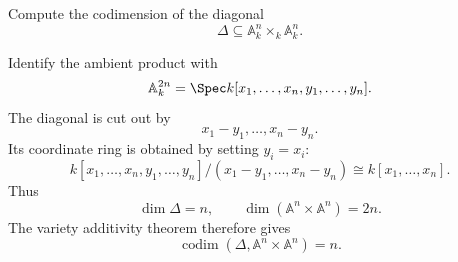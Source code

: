 \begin{problem}\label{prob:vi31-09}
Compute the codimension of the diagonal
\[
\Delta\subseteq\mathbb A^n_k\times_k\mathbb A^n_k.
\]
\end{problem}

\ifdefined\FullProblemDossiers
\begin{solution}
Identify the ambient product with
\[
\mathbb A^{2n}_k
=
\Spec k[x_1,\ldots,x_n,y_1,\ldots,y_n].
\]
The diagonal is cut out by
\[
x_1-y_1,\ldots,x_n-y_n.
\]
Its coordinate ring is obtained by setting \(y_i=x_i\):
\[
k[x_1,\ldots,x_n,y_1,\ldots,y_n]/(x_1-y_1,\ldots,x_n-y_n)
\cong
k[x_1,\ldots,x_n].
\]
Thus
\[
\dim\Delta=n,
\qquad
\dim(\mathbb A^n\times\mathbb A^n)=2n.
\]
The variety additivity theorem therefore gives
\[
\boxed{\operatorname{codim}(\Delta,\mathbb A^n\times\mathbb A^n)=n}.
\]
\end{solution}
\fi
